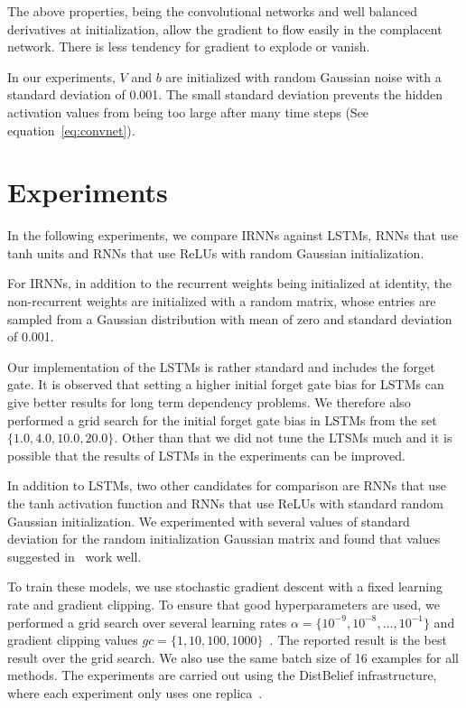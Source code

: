 \documentclass{article} \usepackage{nips14submit_e,times,graphicx}
\begin{document}
The above properties, being the convolutional networks and well
balanced derivatives at initialization, allow the gradient to flow
easily in the complacent network. There is less tendency for gradient
to explode or vanish.

In our experiments, $V$ and $b$ are initialized with random Gaussian
noise with a standard deviation of 0.001. The small standard deviation
prevents the hidden activation values from being too large after many
time steps (See equation~\ref{eq:convnet}).
\fi

\section{Experiments}
In the following experiments, we compare IRNNs against LSTMs, RNNs
that use tanh units and RNNs that use ReLUs with random Gaussian
initialization.



For IRNNs, in addition to the recurrent weights being initialized at
identity, the non-recurrent weights are initialized with a random
matrix, whose entries are sampled from a Gaussian distribution with
mean of zero and standard deviation of 0.001.

Our implementation of the LSTMs is rather standard and includes the
forget gate. It is observed that setting a higher initial forget gate
bias for LSTMs can give better results for long term dependency
problems. We therefore also performed a grid search for the initial
forget gate bias in LSTMs from the set $\{1.0, 4.0, 10.0,
20.0\}$. Other than that we did not tune the LTSMs much and it is
possible that the results of LSTMs in the experiments can be improved.

In addition to LSTMs, two other candidates for comparison are RNNs
that use the tanh activation function and RNNs that use ReLUs with
standard random Gaussian initialization. We experimented with several
values of standard deviation for the random initialization Gaussian
matrix and found that values suggested in~\cite{sussillo2015} work
well.

To train these models, we use stochastic gradient descent with a fixed
learning rate and gradient clipping. To ensure that good
hyperparameters are used, we performed a grid search over several
learning rates $\alpha = \{10^{-9},10^{-8},...,10^{-1}\}$ and gradient
clipping values $gc = \{1, 10, 100,
1000\}$~\cite{graves13c,sutskever14}. The reported result is the best
result over the grid search. We also use the same batch size of 16
examples for all methods. The experiments are carried out using the
DistBelief infrastructure, where each experiment only uses one
replica~\cite{le12,dean12}.
\end{document}
